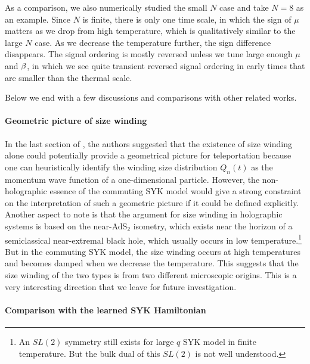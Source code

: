 \documentclass[11pt]{article}
\renewcommand{\>}{\rangle}
\newcommand{\<}{\langle}
\begin{document}
As a comparison, we also numerically studied the small $N$ case and
take $N=8$ as an example. Since $N$ is finite, there is only one time scale, in which the sign of $\mu$ matters as we drop from high temperature, which is qualitatively similar
to the large $N$ case. As we decrease the temperature further, the sign difference disappears. The signal ordering is mostly reversed
unless we tune large enough $\mu$ and $\beta$, in which we see quite
transient reversed signal ordering in early times that are smaller than the thermal scale.

Below we end with a few discussions and comparisons with other related
works.

\paragraph{Geometric picture of size winding }

In the last section of \cite{Nezami:2021yaq}, the authors suggested that the
existence of size winding alone could potentially provide a geometrical
picture for teleportation because one can heuristically identify the
winding size distribution $Q_{n}(t)$ as the momentum wave function
of a one-dimensional particle. However, the non-holographic essence
of the commuting SYK model would give a strong constraint on the interpretation
of such a geometric picture if it could be defined explicitly. Another
aspect to note is that the argument for size winding in holographic
systems \cite{Nezami:2021yaq} is based on the near-AdS$_{2}$ isometry, which
exists near the horizon of a semiclassical near-extremal black hole,
which usually occurs in low temperature.\footnote{An $SL(2)$ symmetry still exists for large
$q$ SYK model in finite temperature. But the bulk dual of this $SL(2)$
is not well understood.} But in the commuting SYK model, the size winding occurs at high temperatures
and becomes damped when we decrease the temperature. This suggests that the size winding of the two types is from two different microscopic origins. This is a very interesting direction that we leave for future
investigation.

\paragraph{Comparison with the learned SYK Hamiltonian}
\end{document}
